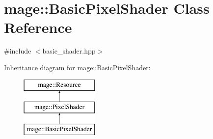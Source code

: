 \hypertarget{classmage_1_1_basic_pixel_shader}{}\section{mage\+:\+:Basic\+Pixel\+Shader Class Reference}
\label{classmage_1_1_basic_pixel_shader}


{\ttfamily \#include $<$basic\+\_\+shader.\+hpp$>$}

Inheritance diagram for mage\+:\+:Basic\+Pixel\+Shader\+:\begin{figure}[H]
\begin{center}
\leavevmode
\includegraphics[height=3.000000cm]{classmage_1_1_basic_pixel_shader}
\end{center}
\end{figure}
